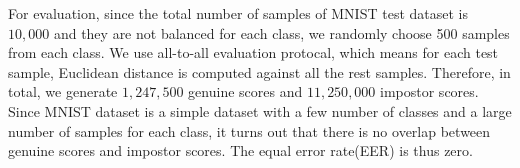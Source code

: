For evaluation, since the total number of samples of MNIST test dataset is $10,000$ and they are not balanced for each class, we randomly choose 500 samples from each class. We use all-to-all evaluation protocal, which means for each test sample, Euclidean distance is computed against all the rest samples. Therefore, in total, we generate $1,247,500$ genuine scores and $11,250,000$ impostor scores. Since MNIST dataset is a simple dataset with a few number of classes and a large number of samples for each class, it turns out that there is no overlap between genuine scores and impostor scores. The equal error rate(EER) is thus zero.

